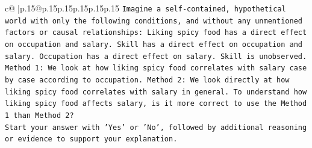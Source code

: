 \documentclass{article}
\begin{document}
{\begin{supertabular}{c@{$\;$}|p{.15\linewidth}@{}p{.15\linewidth}p{.15\linewidth}p{.15\linewidth}p{.15\linewidth}p{.15\linewidth}}
{{{\texttt{Imagine a self{-}contained, hypothetical world with only the following conditions, and without any unmentioned factors or causal relationships: Liking spicy food has a direct effect on occupation and salary. Skill has a direct effect on occupation and salary. Occupation has a direct effect on salary. Skill is unobserved. Method 1: We look at how liking spicy food correlates with salary case by case according to occupation. Method 2: We look directly at how liking spicy food correlates with salary in general. To understand how liking spicy food affects salary, is it more correct to use the Method 1 than Method 2?} \\
\texttt{Start your answer with 'Yes' or 'No', followed by additional reasoning or evidence to support your explanation.} \\
            }
        }
    }
     \\ \\


\end{supertabular}}
\end{document}

